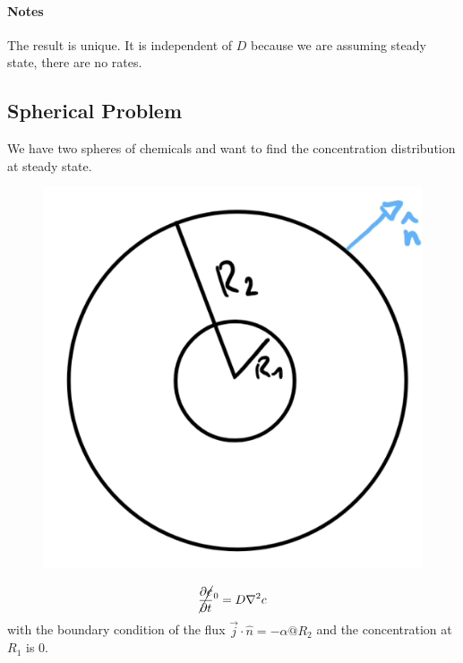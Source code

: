 \paragraph{Notes} The result is unique. It is independent of $D$ because we are assuming steady state, there are no rates.

\subsection{Spherical Problem}

We have two spheres of chemicals and want to find the concentration distribution at steady state.
\begin{figure}[H]
	\centering
	\includegraphics[width=0.4\linewidth]{Sketches/SpheresDiffusion}
	\label{fig:spheresdiffusion}
\end{figure}

\begin{equation*}
	\cancel{\frac{\partial c}{\partial t}}^0 = D\nabla ^2 c
\end{equation*}
with the boundary condition of the flux $\vec j \cdot \hat n = -\alpha @ R_2$ and the concentration at $R_1$ is $0$.

